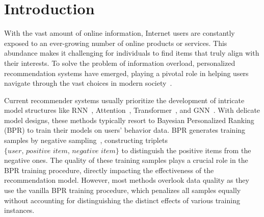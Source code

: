 \section{Introduction}
With the vast amount of online information, Internet users are constantly exposed to an ever-growing number of online products or services. This abundance makes it challenging for individuals to find items that truly align with their interests. To solve the problem of information overload, personalized recommendation systems have emerged, playing a pivotal role in helping users navigate through the vast choices in modern society~\cite{ma2019hierarchical, ma2020memory, 10.1145/3477495.3532043, 10.1145/3626772.3657761}.


Current recommender systems usually prioritize the development of intricate model structures like RNN~\cite{HidasiKBT15}, Attention~\cite{10.1145/3626772.3657748}, Transformer~\cite{10.1145/3357384.3357895}, and GNN~\cite{he2020lightgcn}. With delicate model designs, these methods typically resort to Bayesian Personalized Ranking (BPR) to train their models on users' behavior data. BPR generates training samples by negative sampling~\cite{10.5555/1795114.1795167}, constructing triplets $\{\textit{user, positive item, negative item}\}$ to distinguish the positive items from the negative ones. The quality of these training samples plays a crucial role in the BPR training procedure, directly impacting the effectiveness of the recommendation model. However, most methods overlook data quality as they use the vanilla BPR training procedure, which penalizes all samples equally without accounting for distinguishing the distinct effects of various training instances.

